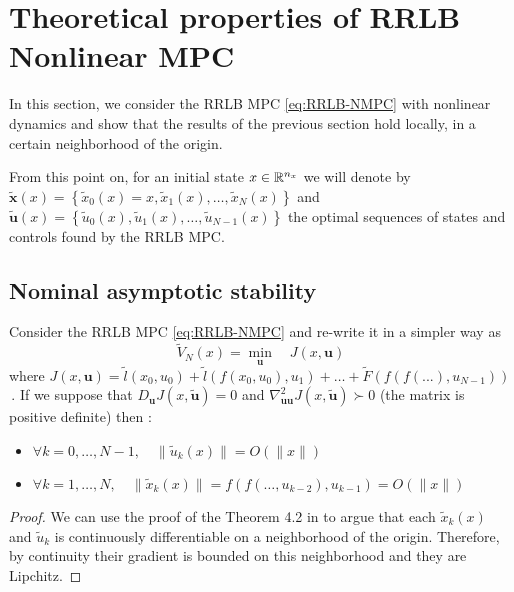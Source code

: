 \documentclass[12pt]{article}
\begin{document}
\section{Theoretical properties of RRLB Nonlinear MPC}\label{sec:RRLB-theoretical-properties}

In this section, we consider the RRLB MPC \ref{eq:RRLB-NMPC} with nonlinear dynamics and show that the results of the previous section hold locally, in a certain neighborhood of the origin.

From this point on, for an initial state $x\in\mathbb{R}^{n_x}$ we will denote by \newline
$\tilde{\mathbf{x}}(x)=\left\{ \tilde{x}_0(x)=x,\tilde{x}_1(x),\dots,\tilde{x}_N(x) \right\}$ and $\tilde{\mathbf{u}}(x)=\left\{ \tilde{u}_0(x),\tilde{u}_1(x),\dots,\tilde{u}_{N-1}(x) \right\}$ the optimal sequences of states and controls found by the RRLB MPC.

\subsection{Nominal asymptotic stability}\label{sec:RRLB-nominal-stability}

\begin{lemma}
	\label{thm:Lipchitzianity}
	Consider the RRLB MPC \ref{eq:RRLB-NMPC} and re-write it in a simpler way as 
	$$\tilde{V}_N(x)=\underset{\mathbf{u}}{\min} \quad J(x,\mathbf{u})$$
	where $J(x,\mathbf{u})=\tilde{l}(x_0,u_0)+\tilde{l}(f(x_0,u_0),u_1)+\dots+\tilde{F}(f(f(...),u_{N-1}))$\,.
	If we suppose that $D_\mathbf{u}J(x,\tilde{\mathbf{u}})=0$ and $\nabla_{\mathbf{u}\mathbf{u}}^2J(x, \tilde{\mathbf{u}})\succ 0$ (the matrix is positive definite) then :
	\begin{itemize}[label=\textbullet]
		\item $\forall k=0,\dots,N-1,\quad \|\tilde{u}_k(x)\|=O(\|x\|)$
		\item $\forall k=1,\dots,N,\quad \|\tilde{x}_k(x)\|=f(f(\dots,u_{k-2}),u_{k-1})=O(\|x\|)$
	\end{itemize}
\end{lemma}
\begin{proof}
	We can use the proof of the Theorem 4.2 in \cite{lectures-parametric-optimization} to argue that each $\tilde{x}_k(x)$ and $\tilde{u}_k$ is continuously differentiable on a neighborhood of the origin.
	Therefore, by continuity their gradient is bounded on this neighborhood and they are Lipchitz.
\end{proof}
\end{document}
